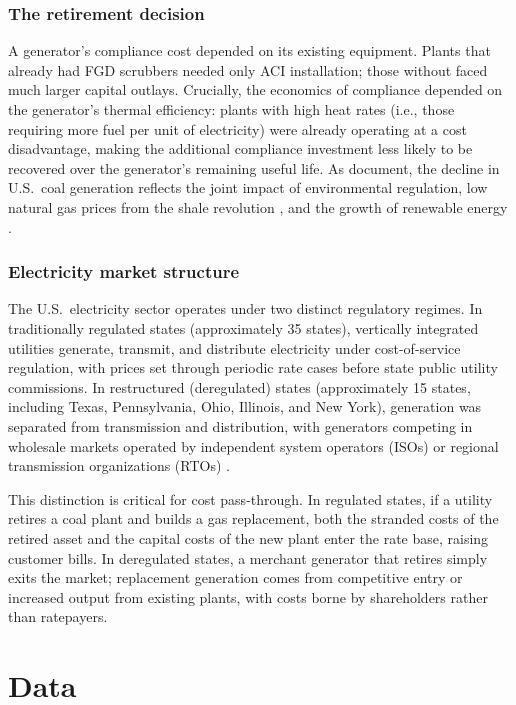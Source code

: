 \documentclass[12pt]{article}
\begin{document}
\subsubsection*{The retirement decision} A generator's compliance cost depended on its existing equipment. Plants that already had FGD scrubbers needed only ACI installation; those without faced much larger capital outlays. Crucially, the economics of compliance depended on the generator's thermal efficiency: plants with high heat rates (i.e., those requiring more fuel per unit of electricity) were already operating at a cost disadvantage, making the additional compliance investment less likely to be recovered over the generator's remaining useful life. As \citet{coglianese2020anticipation} document, the decline in U.S.\ coal generation reflects the joint impact of environmental regulation, low natural gas prices from the shale revolution \citep{knittel2016closing, cullen2013measuring}, and the growth of renewable energy \citep{fell2021emissions}.

\subsubsection*{Electricity market structure} The U.S.\ electricity sector operates under two distinct regulatory regimes. In traditionally regulated states (approximately 35 states), vertically integrated utilities generate, transmit, and distribute electricity under cost-of-service regulation, with prices set through periodic rate cases before state public utility commissions. In restructured (deregulated) states (approximately 15 states, including Texas, Pennsylvania, Ohio, Illinois, and New York), generation was separated from transmission and distribution, with generators competing in wholesale markets operated by independent system operators (ISOs) or regional transmission organizations (RTOs) \citep{joskow1998competitive, fabrizio2007public}.

This distinction is critical for cost pass-through. In regulated states, if a utility retires a coal plant and builds a gas replacement, both the stranded costs of the retired asset and the capital costs of the new plant enter the rate base, raising customer bills. In deregulated states, a merchant generator that retires simply exits the market; replacement generation comes from competitive entry or increased output from existing plants, with costs borne by shareholders rather than ratepayers.


\section{Data}
\end{document}
